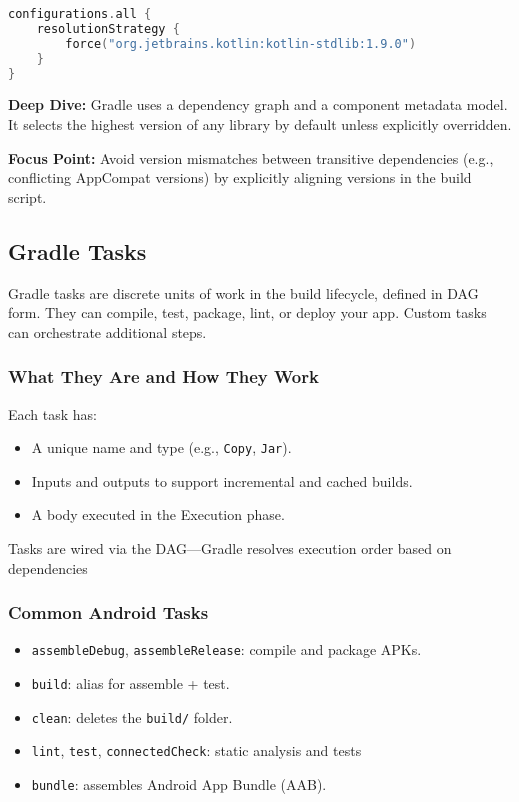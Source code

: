 \documentclass[a4paper,12pt]{article}
\begin{document}
\begin{lstlisting}[language=Kotlin]
configurations.all {
    resolutionStrategy {
        force("org.jetbrains.kotlin:kotlin-stdlib:1.9.0")
    }
}
\end{lstlisting}

\textbf{Deep Dive:} Gradle uses a dependency graph and a component metadata model. It selects the highest version of any library by default unless explicitly overridden.

\textbf{Focus Point:} Avoid version mismatches between transitive dependencies (e.g., conflicting AppCompat versions) by explicitly aligning versions in the build script.

\subsection{Gradle Tasks}

Gradle tasks are discrete units of work in the build lifecycle, defined in DAG form. They can compile, test, package, lint, or deploy your app. Custom tasks can orchestrate additional steps.

\subsubsection{What They Are and How They Work}

Each task has:
\begin{itemize}
  \item A unique name and type (e.g., \texttt{Copy}, \texttt{Jar}).
  \item Inputs and outputs to support incremental and cached builds.
  \item A body executed in the Execution phase.
\end{itemize}

Tasks are wired via the DAG—Gradle resolves execution order based on dependencies

\subsubsection{Common Android Tasks}

\begin{itemize}
  \item \texttt{assembleDebug}, \texttt{assembleRelease}: compile and package APKs.
  \item \texttt{build}: alias for assemble + test.
  \item \texttt{clean}: deletes the \texttt{build/} folder.
  \item \texttt{lint}, \texttt{test}, \texttt{connectedCheck}: static analysis and tests 
  \item \texttt{bundle}: assembles Android App Bundle (AAB).
\end{itemize}
\end{document}
